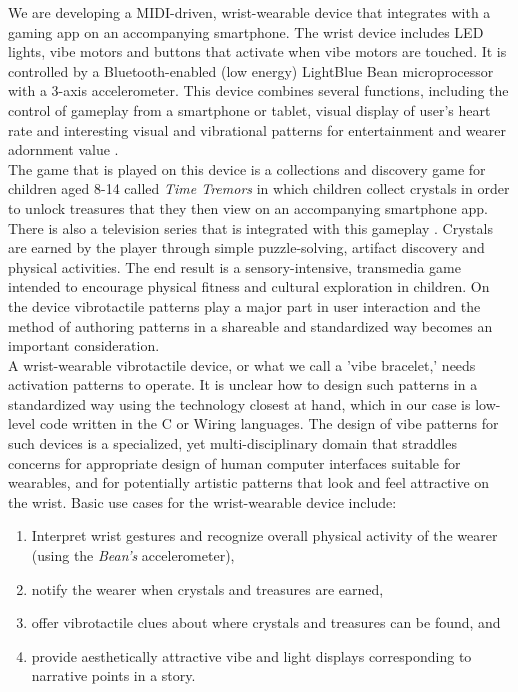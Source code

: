 \documentclass[a4paper, twocolumn]{article}
\begin{document}
We are developing a MIDI-driven, wrist-wearable device that integrates with a gaming app on an accompanying smartphone. The wrist device includes LED lights, vibe motors and buttons that activate when vibe motors are touched. It is controlled by a Bluetooth-enabled (low energy) LightBlue Bean microprocessor with a 3-axis accelerometer. This device combines several functions, including the control of gameplay from a smartphone or tablet, visual display of user's heart rate and interesting visual and vibrational patterns for entertainment and wearer adornment value \cite{tindale2014wearable}.\\

The game that is played on this device is a collections and discovery game for children aged 8-14 called \textit{Time Tremors} in which children collect crystals in order to unlock treasures that they then view on an accompanying smartphone app. There is also a television series that is integrated with this gameplay \cite{holler2014time}. Crystals are earned by the player through simple puzzle-solving, artifact discovery and physical activities. The end result is a sensory-intensive, transmedia game intended to encourage physical fitness and cultural exploration in children. On the device vibrotactile patterns play a major part in user interaction and the method of authoring patterns in a shareable and standardized way becomes an important consideration.\\

A wrist-wearable vibrotactile device, or what we call a 'vibe bracelet,' needs activation patterns to operate. It is unclear how to design such patterns in a standardized way using the technology closest at hand, which in our case is low-level code written in the C or Wiring languages. The design of vibe patterns for such devices is a specialized, yet multi-disciplinary domain that straddles concerns for appropriate design of human computer interfaces suitable for wearables, and for potentially artistic patterns that look and feel attractive on the wrist. Basic use cases for the wrist-wearable device include:
\begin{enumerate}
  \item Interpret wrist gestures and recognize overall physical activity of the wearer (using the \textit{Bean's} accelerometer),
  \item notify the wearer when crystals and treasures are earned,
  \item offer vibrotactile clues about where crystals and treasures can be found, and
  \item provide aesthetically attractive vibe and light displays corresponding to narrative points in a story.\\
\end{enumerate}
\end{document}
